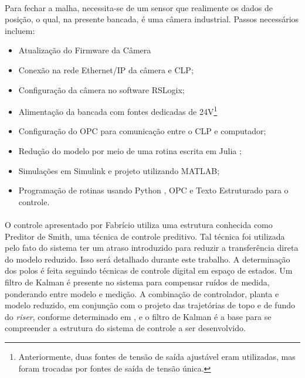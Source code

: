 \paragraph{} Para fechar a malha, necessita-se de um sensor que realimente os dados de posição, o qual, na presente bancada, é uma câmera industrial. Passos necessários incluem: \begin{itemize}
	\item Atualização do Firmware da Câmera
	\item Conexão na rede Ethernet/IP da câmera e CLP;
	\item Configuração da câmera no software RSLogix;
	\item Alimentação da bancada com fontes dedicadas de 24V\footnote{Anteriormente, duas fontes de tensão de saída ajustável eram utilizadas, mas foram trocadas por fontes de saída de tensão única.}
	\item Configuração do OPC para comunicação entre o CLP e computador;
	\item Redução do modelo por meio de uma rotina escrita em Julia \cite{julia};
	\item Simulações em Simulink e projeto utilizando MATLAB;
	\item Programação de rotinas usando Python \cite{python}, OPC e Texto Estruturado para o controle.
\end{itemize}

\paragraph{} O controle apresentado por Fabrício \cite{fabricioIFAC} utiliza uma estrutura conhecida como Preditor de Smith, uma técnica de controle preditivo. Tal técnica foi utilizada pelo fato do sistema ter um atraso introduzido para reduzir a transferência direta do modelo reduzido. Isso será detalhado durante este trabalho. A determinação dos polos é feita seguindo técnicas de controle digital em espaço de estados. Um filtro de Kalman é presente no sistema para compensar ruídos de medida, ponderando entre modelo e medição. A combinação de controlador, planta e modelo reduzido, em conjunção com o projeto das trajetórias de topo e de fundo do \textit{riser}, conforme determinado em \cite{fabricioIFAC}, e o filtro de Kalman é a base para se compreender a estrutura do sistema de controle a ser desenvolvido.
